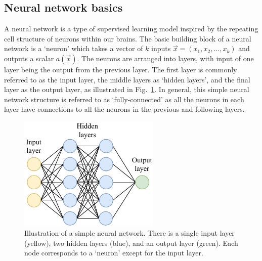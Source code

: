 
\subsection{Neural network basics} %
\label{sec:cvn_theory_basics} %

A neural network is a type of supervised learning model inspired by the repeating cell structure
of neurons within our brains. The basic building block of a neural network is a `neuron' which
takes a vector of $k$ inputs $\vec{x} = (x_{1}, x_{2},\dots,x_{k})$ and outputs a scalar
$a(\vec{x})$. The neurons are arranged into layers, with input of one layer being the output from
the previous layer. The first layer is commonly referred to as the input layer, the middle layers
as `hidden layers', and the final layer as the output layer, as illustrated in
Fig.~\ref{fig:network}. In general, this simple neural network structure is referred to as
`fully-connected' as all the neurons in each layer have connections to all the neurons in the
previous and following layers.

\begin{figure} %
    \includegraphics[width=0.6\textwidth]{diagrams/6-cvn/network.pdf}
    \caption[Illustration of a simple neural network]
    {Illustration of a simple neural network. There is a single input layer (yellow), two hidden
        layers (blue), and an output layer (green). Each node corresponds to a `neuron' except for
        the input layer.}
    \label{fig:network}
\end{figure}

